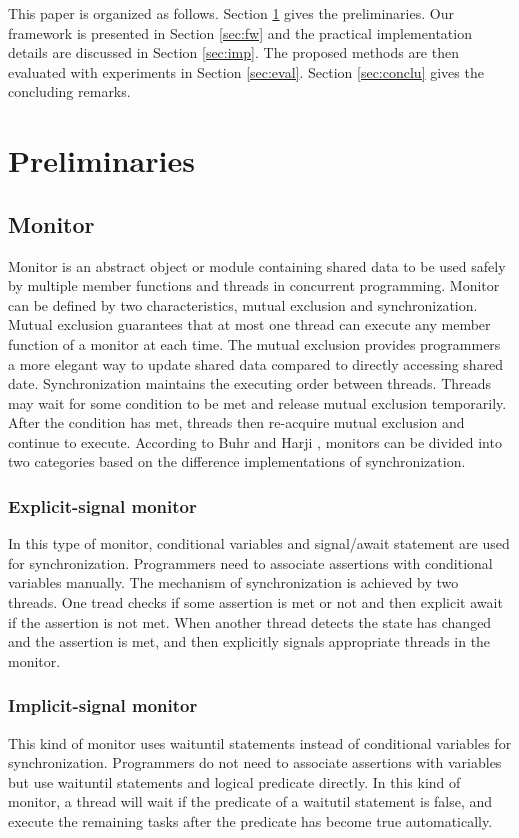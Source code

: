 \documentclass[10pt, conference, compsocconf]{IEEEtran}
\begin{document}
This paper is organized as follows. Section \ref{sec:pre} gives the
preliminaries. 
Our framework is presented in Section \ref{sec:fw} and the practical 
implementation details are discussed in Section \ref{sec:imp}. The proposed 
methods are then evaluated with experiments in Section \ref{sec:eval}. 
Section \ref{sec:conclu} gives the concluding remarks.

\section{Preliminaries} \label{sec:pre}
\subsection{Monitor}
Monitor is an abstract object or module containing shared data to be used safely
by multiple member functions and threads in concurrent programming. Monitor can
be defined by two characteristics, mutual exclusion and synchronization. Mutual 
exclusion guarantees that at most one thread can execute any member function of 
a monitor at each time. The mutual exclusion provides programmers a more elegant
way to update shared data compared to directly accessing shared date. 
Synchronization maintains the executing order between threads. Threads may wait
for some condition to be met and release mutual exclusion temporarily. After the
condition has met, threads then re-acquire mutual exclusion and continue to 
execute.
According to Buhr and Harji \cite{bh05}, monitors can be divided into two 
categories based on the difference implementations of synchronization. 
  \subsubsection{Explicit-signal monitor} In this type of monitor, conditional
    variables
    and signal/await statement are used for synchronization. Programmers need to
    associate assertions with conditional variables manually. The mechanism of
    synchronization is achieved by two threads. One tread checks if some
    assertion is met or not and then explicit await if the assertion is not
    met. When another thread detects the state has changed and the assertion is
    met, and then explicitly signals appropriate threads in the monitor.
  \subsubsection{Implicit-signal monitor} This kind of monitor uses waituntil
    statements instead of conditional variables for
    synchronization. Programmers do not need to associate assertions with
    variables but use waituntil statements and logical predicate directly. In
    this kind of monitor, a thread will wait if the predicate of a waitutil
    statement is false, and execute the remaining tasks after the predicate
    has become true automatically.
\end{document}
